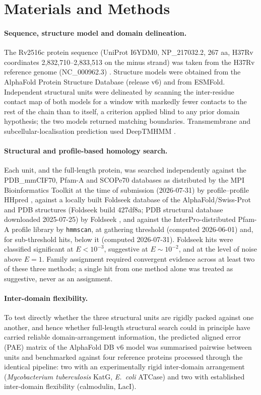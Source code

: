 \documentclass[11pt,a4paper]{article}
\newcommand{\mtb}{\textit{Mycobacterium tuberculosis}}
\begin{document}
\section{Materials and Methods}

\paragraph{Sequence, structure model and domain delineation.} The Rv2516c protein sequence
(UniProt I6YDM0, NP\_217032.2, 267 aa, H37Rv coordinates 2{,}832{,}710--2{,}833{,}513 on the minus
strand) was taken from the H37Rv reference genome (NC\_000962.3) \citep{cole1998genome}. Structure
models were obtained from the AlphaFold Protein Structure Database (release v6)
\citep{jumper2021alphafold,varadi2022afdb} and from ESMFold. Independent structural units were
delineated by scanning the inter-residue contact map of
both models for a window with markedly fewer contacts to the rest of the chain than to itself, a
criterion applied blind to any prior domain hypothesis; the two models returned matching
boundaries. Transmembrane and subcellular-localisation prediction used DeepTMHMM
\citep{hallgren2022deeptmhmm}.

\paragraph{Structural and profile-based homology search.} Each unit, and the full-length protein,
was searched independently against the PDB\_mmCIF70, Pfam-A and SCOPe70 databases as distributed by
the MPI Bioinformatics Toolkit at the time of submission (2026-07-31) by profile--profile HHpred
\citep{zimmermann2018hhpred}, against a locally built Foldseek database of the AlphaFold/Swiss-Prot
and PDB structures (Foldseek build 427df8a; PDB structural database downloaded 2025-07-25) by
Foldseek \citep{vankempen2024foldseek}, and against the InterPro-distributed Pfam-A profile library
\citep{paysanlafosse2023interpro} by \texttt{hmmscan}, at gathering threshold (computed 2026-06-01)
and, for sub-threshold hits, below it (computed 2026-07-31). Foldseek hits were classified
significant at $E<10^{-3}$, suggestive at $E\sim10^{-2}$, and at the level of noise above $E=1$.
Family assignment required convergent evidence across at least two of these three methods; a single
hit from one method alone was treated as suggestive, never as an assignment.

\paragraph{Inter-domain flexibility.} To test directly whether the three structural units are
rigidly packed against one another, and hence whether full-length structural search could in
principle have carried reliable domain-arrangement information, the predicted aligned error (PAE)
matrix of the AlphaFold DB v6 model was summarised pairwise between units and benchmarked against
four reference proteins processed through the identical pipeline: two with an experimentally rigid
inter-domain arrangement (\mtb{} KatG, \textit{E.\ coli} ATCase) and two with established
inter-domain flexibility (calmodulin, LacI).
\end{document}
